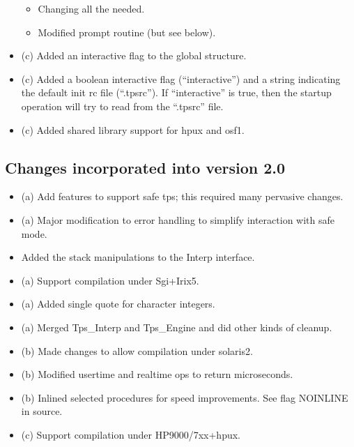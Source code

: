 \begin{itemize}
\begin{itemize}
	\item Changing all the %
		needed.
	\item Modified prompt routine (but see below).
    \end{itemize}
\item (c) Added an interactive flag to the global structure.
\item (c) Added a boolean interactive flag (``interactive'')
	  and a string indicating the default init rc file (``.tpsrc'').
	  If ``interactive'' is true, then the startup operation
	  will try to read from the ``.tpsrc'' file.
\item (c) Added shared library support for hpux and osf1.
\end{itemize}

\subsection{Changes incorporated into version 2.0}
\begin{itemize}
\item (a) Add features to support safe tps;
this required many pervasive changes.
\item (a) Major modification to error handling to simplify interaction
with safe mode.
\item Added the stack manipulations to the Interp interface.
\item (a) Support compilation under Sgi+Irix5.
\item (a) Added single quote for character integers.
\item (a) Merged Tps\_Interp and Tps\_Engine and did other kinds of cleanup.
\item (b) Made changes to allow compilation under solaris2.
\item (b) Modified usertime and realtime ops to return microseconds.
\item (b) Inlined selected procedures for speed improvements.
See flag NOINLINE in source.
\item (c) Support compilation under HP9000/7xx+hpux.
\end{itemize}

